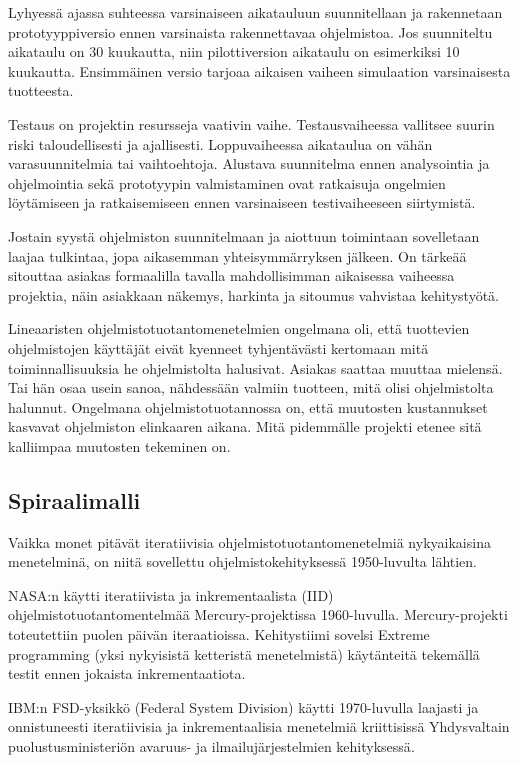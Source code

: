 \documentclass[finnish]{tktltiki2}
\theoremstyle{definition}
\theoremstyle{remark}
\begin{document}
Lyhyessä ajassa suhteessa varsinaiseen aikatauluun suunnitellaan ja rakennetaan prototyyppiversio ennen varsinaista rakennettavaa ohjelmistoa. Jos suunniteltu aikataulu on 30 kuukautta, niin pilottiversion aikataulu on esimerkiksi 10 kuukautta. Ensimmäinen versio tarjoaa aikaisen vaiheen simulaation varsinaisesta tuotteesta\cite{ROY70}.

Testaus on projektin resursseja vaativin vaihe. Testausvaiheessa vallitsee suurin riski taloudellisesti ja ajallisesti. Loppuvaiheessa aikataulua on vähän varasuunnitelmia tai vaihtoehtoja. Alustava suunnitelma ennen analysointia ja ohjelmointia sekä prototyypin valmistaminen ovat ratkaisuja ongelmien löytämiseen ja ratkaisemiseen ennen varsinaiseen testivaiheeseen siirtymistä\cite{ROY70}.

Jostain syystä ohjelmiston suunnitelmaan ja aiottuun toimintaan sovelletaan laajaa tulkintaa, jopa aikasemman yhteisymmärryksen jälkeen. On tärkeää sitouttaa asiakas formaalilla tavalla mahdollisimman aikaisessa vaiheessa projektia, näin asiakkaan näkemys, harkinta ja sitoumus vahvistaa kehitystyötä\cite{ROY70}.

Lineaaristen ohjelmistotuotantomenetelmien ongelmana oli, että tuottevien ohjelmistojen käyttäjät eivät kyenneet tyhjentävästi kertomaan mitä toiminnallisuuksia he ohjelmistolta halusivat. Asiakas saattaa muuttaa mielensä. Tai hän osaa usein sanoa, nähdessään valmiin tuotteen, mitä olisi ohjelmistolta halunnut\cite{BEC99}. Ongelmana ohjelmistotuotannossa on, että muutosten kustannukset kasvavat ohjelmiston elinkaaren aikana. Mitä pidemmälle projekti etenee sitä kalliimpaa muutosten tekeminen on\cite{HIC01}. 	  

\subsection{Spiraalimalli}

Vaikka monet pitävät iteratiivisia ohjelmistotuotantomenetelmiä nykyaikaisina menetelminä, on niitä sovellettu ohjelmistokehityksessä 1950-luvulta lähtien\cite{LAB03}.

NASA:n käytti iteratiivista ja inkrementaalista (IID) ohjelmistotuotantomentelmää Mercury-projektissa 1960-luvulla. Mercury-projekti toteutettiin puolen päivän iteraatioissa. Kehitystiimi sovelsi Extreme programming (yksi nykyisistä ketteristä menetelmistä) käytänteitä tekemällä testit ennen jokaista inkremen\-taatiota\cite{LAB03}.

IBM:n FSD-yksikkö (Federal System Division) käytti 1970-luvulla laajasti ja onnistuneesti iteratiivisia ja inkrementaalisia menetelmiä kriittisissä Yhdysvaltain puolustusministeriön avaruus- ja ilmailujärjestelmien kehityksessä\cite{LAB03}.
\end{document}
